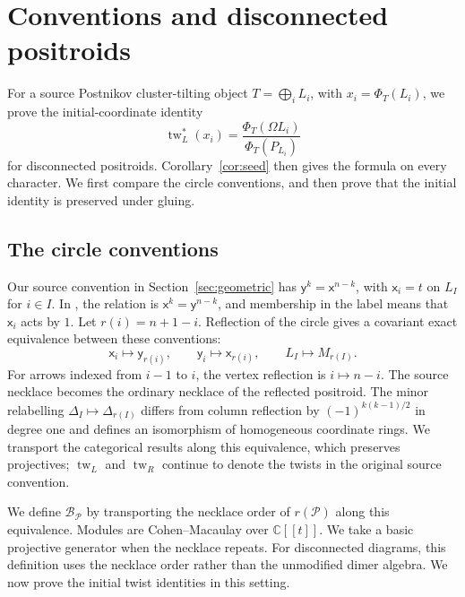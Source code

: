 \documentclass[11pt]{amsart}
\numberwithin{equation}{section}
\theoremstyle{definition}
\theoremstyle{remark}
\newcommand{\op}[1]{\operatorname{#1}}
\newcommand{\Pcal}{\mathcal P}
\newcommand{\tw}{\op{tw}}
\begin{document}
\appendix
\section{Conventions and disconnected positroids}\label{app:positroid}\label{sec:gluing}

For a source Postnikov cluster-tilting object $T=\bigoplus_iL_i$,
with $x_i=\Phi_T(L_i)$, we prove the initial-coordinate identity
\[ \tw_L^*(x_i)=\frac{\Phi_T(\Omega L_i)}{\Phi_T(P_{L_i})} \]
for disconnected positroids. Corollary~\ref{cor:seed} then gives the
formula on every character. We first compare the circle conventions,
and then prove that the initial identity is preserved under gluing.

\subsection{The circle conventions}
Our source convention in Section~\ref{sec:geometric} has
$\mathsf y^k=\mathsf x^{n-k}$, with $\mathsf x_i=t$ on $L_I$ for $i\in I$.
In \cite{JKS24,JRS26}, the relation is $\mathsf x^k=\mathsf y^{n-k}$, and
membership in the label means that $\mathsf x_i$ acts by $1$.
Let $r(i)=n+1-i$. Reflection of the circle gives a covariant exact
equivalence between these conventions:
\[ \mathsf x_i\longmapsto\mathsf y_{r(i)},\qquad \mathsf y_i\longmapsto\mathsf x_{r(i)},\qquad L_I\longmapsto M_{r(I)}. \]
For arrows indexed from $i-1$ to $i$, the vertex reflection is
$i\mapsto n-i$. The source necklace becomes the ordinary necklace
of the reflected positroid. The minor relabelling
$\Delta_I\mapsto\Delta_{r(I)}$ differs from column reflection by
$(-1)^{k(k-1)/2}$ in degree one and defines an isomorphism of
homogeneous coordinate rings. We transport the categorical results along
this equivalence, which preserves projectives; $\tw_L$ and $\tw_R$
continue to denote the twists in the original source convention.

We define $\mathcal B_\Pcal$ by transporting the necklace order of
$r(\Pcal)$ along this equivalence. Modules are Cohen--Macaulay over
$\mathbb C[[t]]$. We take a basic projective generator when the
necklace repeats. For disconnected diagrams, this definition uses the
necklace order rather than the unmodified dimer algebra.
We now prove the initial twist identities in this setting.
\end{document}
